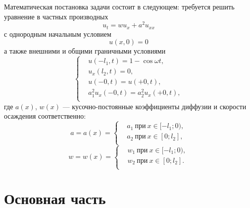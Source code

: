 \documentclass[12pt, a4paper, draft]{article}
\begin{document}
Математическая постановка задачи состоит в следующем: требуется решить уравнение в частных производных
\begin{equation}
 u_t = wu_x + a^2 u_{xx} 
 \label{eq:12}
\end{equation}
с однородным начальным условием
\begin{equation}
 u(x,0) = 0 
\end{equation}
а также внешними и общими граничными условиями 
\begin{equation}
  \left\{
  \begin{aligned}
    & u(-l_1,t) = 1 - \cos \omega t, \\
    & u_x(l_2,t) = 0, \\
    & u(-0, t) = u(+0, t), \\
    & a_1^2 u_{x}(-0, t) = a_2^2 u_{x}(+0, t), \\
  \end{aligned}
  \right.
\end{equation}
где $a(x)$, $w(x)$ --- кусочно-постоянные коэффициенты диффузии и скорости осаждения соответственно:
\begin{equation}
  a=a(x)=\left\{ 
    \begin{aligned}
      & a_1\ \text{при}\ x \in [-l_1;0), \\
      & a_2\ \text{при}\ x \in [0;l_2], \\
    \end{aligned}
\right.
\end{equation}
\begin{equation}
  w=w(x)=\left\{ 
    \begin{aligned}
      & w_1\ \text{при}\ x \in [-l_1;0), \\
      & w_2\ \text{при}\ x \in [0;l_2]. \\
    \end{aligned}
\right.
\end{equation}
\section{Основная часть}
\end{document}
